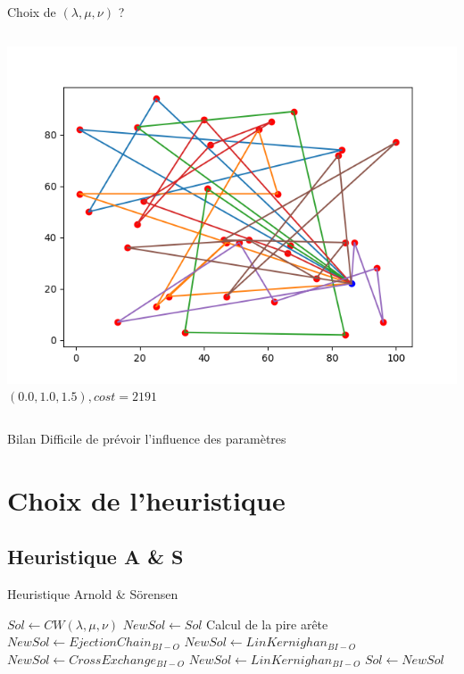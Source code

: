 \documentclass{beamer}
\begin{document}
\begin{frame}{Choix de $(\lambda,\mu,\nu)$ ?}
\begin{columns}[t]
 
  \begin{column}{4cm}
  	\centering
	\includegraphics[scale=0.27]{resCW001015.png}
 	$(0.0,1.0,1.5), cost = 2191$

  \end{column}
 \end{columns}
 
\begin{alertblock}{Bilan}
Difficile de prévoir l'influence des paramètres
\end{alertblock}

\end{frame}

\section{Choix de l'heuristique}

\subsection{Heuristique A \& S}

\begin{frame}{Heuristique Arnold \& Sörensen} 

\begin{algorithm}[H]
\DontPrintSemicolon %

$Sol \gets CW(\lambda,\mu,\nu)$\;
$NewSol \gets Sol$\;
 {
	Calcul de la pire arête\;
	$NewSol \gets EjectionChain_{BI-O}$\;
	$NewSol \gets LinKernighan_{BI-O}$\;
	$NewSol \gets CrossExchange_{BI-O}$\;
	$NewSol \gets LinKernighan_{BI-O}$\;
	 {
		$Sol \gets NewSol$\;
	}
}
\;

\end{algorithm}

\end{frame}
\end{document}
